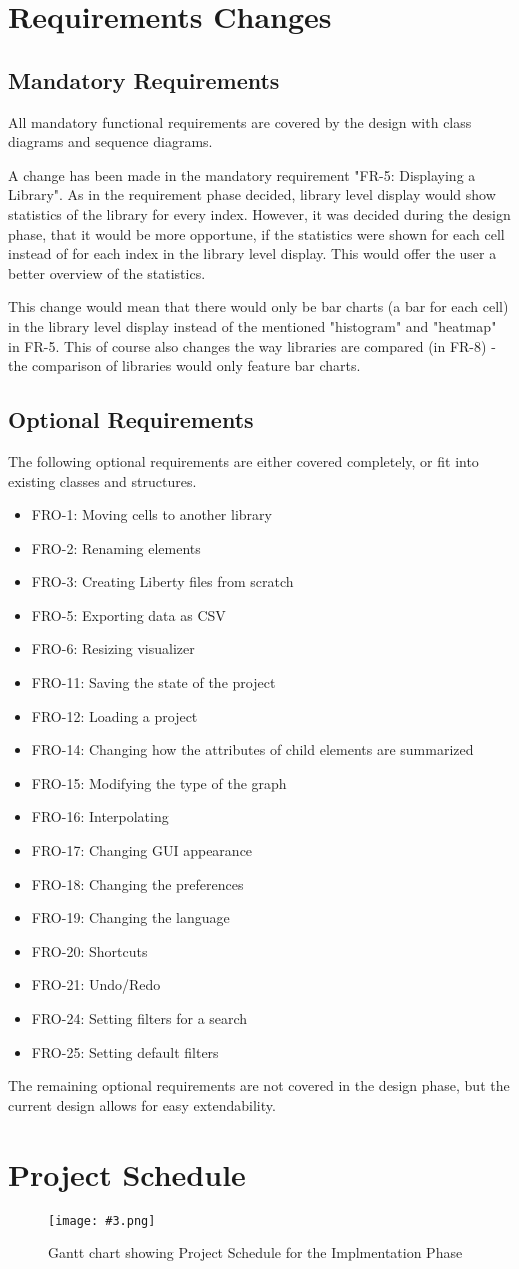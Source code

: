 \documentclass[10pt,a4paper]{report}
\newcommand{\includeimage}[5]{
    \begin{figure}[H]
        #1
        \texttt{[image: \#3.png]}
        \caption{#4}
        \label{fig:#5}
    \end{figure}
}
\newcommand{\patternentry}[2]{
    #1{#2}
}
\newcommand{\pattern}[2]{
    \patternentry{\section}{#1}
    {#2}
}
\begin{document}
\chapter{Requirements Changes}
\pattern{Mandatory Requirements}
{All mandatory functional requirements are covered by the design with class diagrams and sequence diagrams. \newline


A change has been made in the mandatory requirement "FR-5: Displaying a Library". As in the requirement phase decided, library level display would show statistics of the library for every index. However, it was decided during the design phase, that it would be more opportune, if the statistics were shown for each cell instead of for each index in the library level display. This would offer the user a better overview of the statistics. \newline

This change would mean that there would only be bar charts (a bar for each cell) in the library level display instead of the mentioned "histogram" and "heatmap" in FR-5. This of course also changes the way libraries are compared (in FR-8) - the comparison of libraries would only feature bar charts. }
\pattern{Optional Requirements}
{The following optional requirements are either covered completely, or fit into existing classes and structures. 
\begin{itemize}
    \item {FRO-1: Moving cells to another library}
    \item {FRO-2: Renaming elements}
    \item {FRO-3: Creating Liberty files from scratch}
    \item {FRO-5: Exporting data as CSV}
    \item {FRO-6: Resizing visualizer}
    \item {FRO-11: Saving the state of the project}
    \item {FRO-12: Loading a project}
    \item {FRO-14: Changing how the attributes of child elements are summarized}
    \item {FRO-15: Modifying the type of the graph}
    \item {FRO-16: Interpolating}
    \item {FRO-17: Changing GUI appearance}
    \item {FRO-18: Changing the preferences}
    \item {FRO-19: Changing the language}
    \item {FRO-20: Shortcuts}
    \item {FRO-21: Undo/Redo}
    \item {FRO-24: Setting filters for a search}
    \item {FRO-25: Setting default filters}
\end{itemize}}
The remaining optional requirements are not covered in the design phase, but the current design allows for easy extendability.

\chapter{Project Schedule}
\includeimage{}{0.37}{ganttchart}{Gantt chart showing Project Schedule for the Implmentation Phase}{Gantt Chart}
\end{document}
